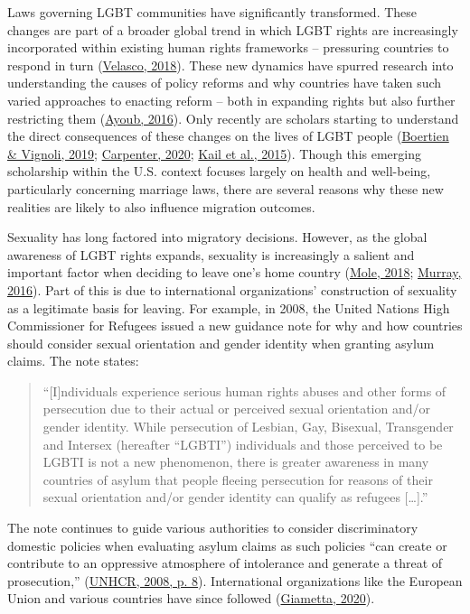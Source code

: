 \documentclass[
  11pt,
]{article}
\begin{document}
Laws governing LGBT communities have significantly transformed. These changes are part of a broader global trend in which LGBT rights are increasingly incorporated within existing human rights frameworks -- pressuring countries to respond in turn (\protect\hyperlink{ref-velasco_2018}{Velasco, 2018}). These new dynamics have spurred research into understanding the causes of policy reforms and why countries have taken such varied approaches to enacting reform -- both in expanding rights but also further restricting them (\protect\hyperlink{ref-ayoub_2016}{Ayoub, 2016}). Only recently are scholars starting to understand the direct consequences of these changes on the lives of LGBT people (\protect\hyperlink{ref-boertien_2019}{Boertien \& Vignoli, 2019}; \protect\hyperlink{ref-carpenter_2020}{Carpenter, 2020}; \protect\hyperlink{ref-kail_2015}{Kail et al., 2015}). Though this emerging scholarship within the U.S. context focuses largely on health and well-being, particularly concerning marriage laws, there are several reasons why these new realities are likely to also influence migration outcomes.

Sexuality has long factored into migratory decisions. However, as the global awareness of LGBT rights expands, sexuality is increasingly a salient and important factor when deciding to leave one's home country (\protect\hyperlink{ref-mole_2018a}{Mole, 2018}; \protect\hyperlink{ref-murray_2016}{Murray, 2016}). Part of this is due to international organizations' construction of sexuality as a legitimate basis for leaving. For example, in 2008, the United Nations High Commissioner for Refugees issued a new guidance note for why and how countries should consider sexual orientation and gender identity when granting asylum claims. The note states:

\begin{quote}
``{[}I{]}ndividuals experience serious human rights abuses and other forms of persecution due to their actual or perceived sexual orientation and/or gender identity. While persecution of Lesbian, Gay, Bisexual, Transgender and Intersex (hereafter ``LGBTI'') individuals and those perceived to be LGBTI is not a new phenomenon, there is greater awareness in many countries of asylum that people fleeing persecution for reasons of their sexual orientation and/or gender identity can qualify as refugees {[}\ldots{]}.''
\end{quote}

The note continues to guide various authorities to consider discriminatory domestic policies when evaluating asylum claims as such policies ``can create or contribute to an oppressive atmosphere of intolerance and generate a threat of prosecution,'' (\protect\hyperlink{ref-unhcr_2008}{UNHCR, 2008, p. 8}). International organizations like the European Union and various countries have since followed (\protect\hyperlink{ref-giametta_2020}{Giametta, 2020}).
\end{document}
